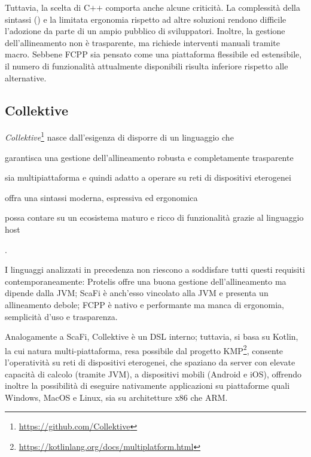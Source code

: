 Tuttavia, la scelta di \(\text{C++}\) comporta anche alcune criticità. La complessità della sintassi () e la limitata ergonomia rispetto ad altre soluzioni rendono difficile l’adozione da parte di un ampio pubblico di sviluppatori. Inoltre, la gestione dell’allineamento non è trasparente, ma richiede interventi manuali tramite macro. Sebbene FCPP sia pensato come una piattaforma flessibile ed estensibile, il numero di funzionalità attualmente disponibili risulta inferiore rispetto alle alternative.





\subsection{Collektive}
\label{sec:collektive}

\emph{Collektive}\footnote{\url{https://github.com/Collektive}} nasce dall'esigenza di disporre di un linguaggio che 
\begin{enumerate*}[label=\roman*), itemjoin={{; }}, itemjoin*={{; }}]
    \item garantisca una gestione dell'allineamento robusta e completamente trasparente
    \item sia multipiattaforma e quindi adatto a operare su reti di dispositivi eterogenei
    \item offra una sintassi moderna, espressiva ed ergonomica
    \item possa contare su un ecosistema maturo e ricco di funzionalità grazie al linguaggio host
\end{enumerate*}.

I linguaggi analizzati in precedenza non riescono a soddisfare tutti questi requisiti contemporaneamente: Protelis offre una buona gestione dell'allineamento ma dipende dalla JVM; ScaFi è anch'esso vincolato alla JVM e presenta un allineamento debole; FCPP è nativo e performante ma manca di ergonomia, semplicità d'uso e trasparenza.

Analogamente a ScaFi, Collektive è un \ac{DSL} interno; tuttavia, si basa su Kotlin, la cui natura multi-piattaforma, resa possibile dal progetto \ac{KMP}\footnote{\url{https://kotlinlang.org/docs/multiplatform.html}}, consente l’operatività su reti di dispositivi eterogenei, che spaziano da server con elevate capacità di calcolo (tramite JVM), a dispositivi mobili (Android e iOS), offrendo inoltre la possibilità di eseguire nativamente applicazioni su piattaforme quali Windows, MacOS e Linux, sia su architetture x86 che ARM.

